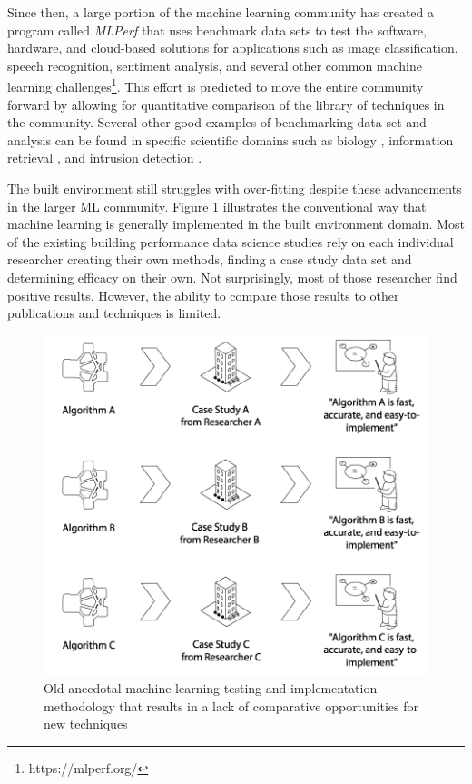\documentclass[preprint,12pt]{elsarticle}
\begin{document}
Since then, a large portion of the machine learning community has created a program called \emph{MLPerf} that uses benchmark data sets to test the software, hardware, and cloud-based solutions for applications such as image classification, speech recognition, sentiment analysis, and several other common machine learning challenges\footnote{https://mlperf.org/}. This effort is predicted to move the entire community forward by allowing for quantitative comparison of the library of techniques in the community. Several other good examples of benchmarking data set and analysis can be found in specific scientific domains such as biology \cite{Sonego2007ALearning}, information retrieval \cite{Liu2007LETORRetrieval}, and intrusion detection \cite{Kayack2005AnalysisAlgorithms}.

The built environment still struggles with over-fitting despite these advancements in the larger ML community. Figure \ref{fig:oldway} illustrates the conventional way that machine learning is generally implemented in the built environment domain. Most of the existing building performance data science studies rely on each individual researcher creating their own methods, finding a case study data set and determining efficacy on their own. Not surprisingly, most of those researcher find positive results. However, the ability to compare those results to other publications and techniques is limited. 

\begin{figure}[ht!]
\begin{center}
\includegraphics[width=1\columnwidth]{figures/Oldway}
\caption{Old anecdotal machine learning testing and implementation methodology that results in a lack of comparative opportunities for new techniques}
\label{fig:oldway}%
\end{center}
\end{figure}
\end{document}
